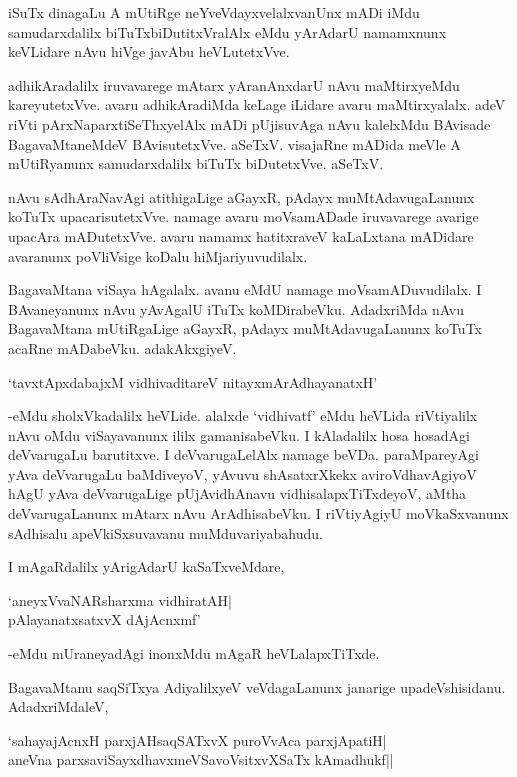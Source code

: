 iSuTx dinagaLu A mUtiRge neYveVdayxvelalxvanUnx mADi iMdu samudarxdalilx biTuTxbiDutitxVralAlx eMdu yArAdarU namamxnunx keVLidare nAvu hiVge javAbu heVLutetxVve.

adhikAradalilx iruvavarege mAtarx yAranAnxdarU nAvu maMtirxyeMdu kareyutetxVve. avaru adhikAradiMda keLage iLidare avaru maMtirxyalalx. adeV riVti pArxNaparxtiSeThxyelAlx mADi pUjisuvAga nAvu kalelxMdu BAvisade BagavaMtaneMdeV BAvisutetxVve. aSeTxV. visajaRne mADida meVle A mUtiRyanunx samudarxdalilx biTuTx biDutetxVve. aSeTxV.

nAvu sAdhAraNavAgi atithigaLige aGayxR, pAdayx muMtAdavugaLanunx koTuTx upacarisutetxVve. namage avaru moVsamADade iruvavarege avarige upacAra mADutetxVve. avaru namamx hatitxraveV kaLaLxtana mADidare avaranunx poVliVsige koDalu hiMjariyuvudilalx.

BagavaMtana viSaya hAgalalx. avanu eMdU namage moVsamADuvudilalx. I BAvaneyanunx nAvu yAvAgalU iTuTx koMDirabeVku. AdadxriMda nAvu BagavaMtana mUtiRgaLige aGayxR, pAdayx muMtAdavugaLanunx koTuTx acaRne mADabeVku. adakAkxgiyeV.

\begin{shloka}
`tavxtApxdabajxM vidhivaditareV nitayxmArAdhayanatxH'
\end{shloka} 

-eMdu sholxVkadalilx heVLide. alalxde `vidhivatf' eMdu heVLida riVtiyalilx nAvu oMdu viSayavanunx ililx gamanisabeVku. I kAladalilx hosa hosadAgi deVvarugaLu barutitxve. I deVvarugaLelAlx namage beVDa. paraMpareyAgi yAva deVvarugaLu baMdiveyoV, yAvuvu shAsatxrXkekx aviroVdhavAgiyoV hAgU yAva deVvarugaLige pUjAvidhAnavu vidhisalapxTiTxdeyoV, aMtha deVvarugaLanunx mAtarx nAvu ArAdhisabeVku. I riVtiyAgiyU moVkaSxvanunx sAdhisalu apeVkiSxsuvavanu muMduvariyabahudu.

I mAgaRdalilx yArigAdarU kaSaTxveMdare,

\begin{shloka}
`aneyxVvaNARsharxma vidhiratAH|\\
pAlayanatxsatxvX dAjAcnxmf'
\end{shloka}

-eMdu mUraneyadAgi inonxMdu mAgaR heVLalapxTiTxde.

BagavaMtanu saqSiTxya AdiyalilxyeV veVdagaLanunx janarige upadeVshisidanu. AdadxriMdaleV,

\begin{shloka}
`sahayajAcnxH parxjAHsaqSATxvX puroVvAca parxjApatiH|\\
aneVna parxsaviSayxdhavxmeVSavoV\s sitxvXSaTx kAmadhukf||
\end{shloka}

